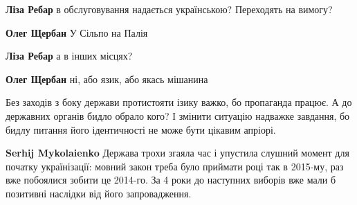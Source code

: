 \begin{itemize}
\begin{itemize}
 
\textbf{Ліза Ребар} в обслуговування надається українською? Переходять на вимогу?

 
\textbf{Олег Щербан} У Сільпо на Палія

 
\textbf{Ліза Ребар} а в інших місцях?

 
\textbf{Олег Щербан} ні, або язик, або якась мішанина
\end{itemize}

 

Без заходів з боку держави протистояти ізику важко, бо пропаганда працює. А до
державних органів бидло обрало кого? І змінити ситуацію надважке завдання, бо
бидлу питання його ідентичності не може бути цікавим апріорі.

\begin{itemize}
 
\textbf{Serhij Mykolaienko} Держава трохи згаяла час і упустила слушний момент для початку українізації: мовний закон треба було приймати році так в 2015-му, раз вже побоялися зобити це 2014-го. За 4 роки до наступних виборів вже мали б позитивні наслідки від його запровадження.


\end{itemize}
\end{itemize}
